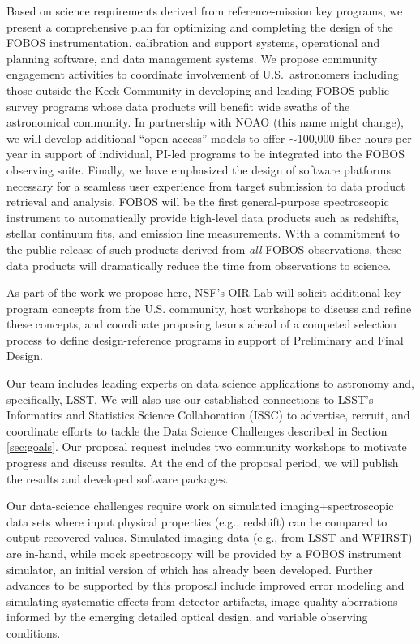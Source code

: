 \documentclass[oneside,11pt]{amsart}
\begin{document}
Based on science requirements derived from reference-mission key programs, we present a comprehensive plan for optimizing and completing the design of the FOBOS instrumentation, calibration and support systems, operational and planning software, and data management systems.  We propose community engagement activities to coordinate involvement of U.S.~astronomers including those outside the Keck Community in developing and leading FOBOS public survey programs whose data products will benefit wide swaths of the astronomical community.  In partnership with NOAO (this name might change), we will develop additional ``open-access'' models to offer $\sim$100,000 fiber-hours per year in support of individual, PI-led programs to be integrated into the FOBOS observing suite.  Finally, we have emphasized the design of software platforms necessary for a seamless user experience from target submission to data product retrieval and analysis.  FOBOS will be the first general-purpose spectroscopic instrument to automatically provide high-level data products such as redshifts, stellar continuum fits, and emission line measurements.  With a commitment to the public release of such products derived from \emph{all} FOBOS observations, these data products will dramatically reduce the time from observations to science.

As part of the work we propose here, NSF's OIR Lab will solicit additional key program concepts from the U.S. community, host workshops to discuss and refine these concepts, and coordinate proposing teams ahead of a competed selection process to define design-reference programs in support of Preliminary and Final Design.



Our team includes leading experts on data science applications to
astronomy and, specifically, LSST.  We will also use our established
connections to LSST's Informatics and Statistics Science Collaboration
(ISSC) to advertise, recruit, and coordinate efforts to tackle the Data
Science Challenges described in Section \ref{sec:goals}.  Our proposal
request includes two community workshops to motivate progress and discuss
results. At the end of the proposal period, we will publish the results
and developed software packages.

Our data-science challenges require work on simulated
imaging$+$spectroscopic data sets where input physical properties (e.g.,
redshift) can be compared to output recovered values.  Simulated imaging
data (e.g., from LSST and WFIRST) are in-hand, while mock spectroscopy
will be provided by a FOBOS instrument simulator, an initial version of
which has already been developed.  Further advances to be supported by
this proposal include improved error modeling and simulating systematic
effects from detector artifacts, image quality aberrations informed by
the emerging detailed optical design, and variable observing conditions.
\end{document}
